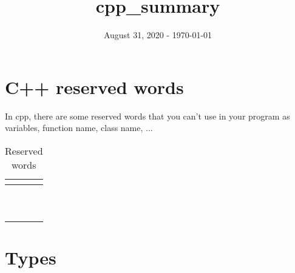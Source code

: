 \documentclass[a4paper, 12pt, titlepage]{scrartcl} %
\title{cpp\_summary}
\author{}
\date{August 31, 2020 - \today}
\begin{document}
\maketitle

\newpage
\section{C++ reserved words}
In cpp, there are some reserved words that you can't use in your program as variables, function name, class name, ...

\vspace{35mm}

\begin{table}[h]
\begin{center}
{\renewcommand{\arraystretch}{2} %
{\setlength{\tabcolsep}{1.5cm} %
\begin{tabular}{|l|c|r|}
  \hline
  \hyperref[]{} & \hyperref[]{} & \hyperref[]{} \\
  \hline
  \hyperref[]{} & \hyperref[]{} & \hyperref[]{} \\
  \hline
  \hyperref[]{} & \hyperref[]{} & \hyperref[]{} \\
  \hline
  \hyperref[]{} & \hyperref[]{} & \hyperref[]{} \\
  \hline
  \hyperref[]{} & \hyperref[]{} & \hyperref[]{} \\
  \hline
  \hyperref[]{} & \hyperref[]{} & \hyperref[]{} \\
  \hline
  \hyperref[]{} & \hyperref[]{} & \hyperref[]{} \\
  \hline
  \hyperref[]{} & \hyperref[]{} & \hyperref[]{} \\
  \hline 
  \hyperref[]{} & \hyperref[]{} & \hyperref[]{} \\
  \hline 
  \hyperref[]{} & \hyperref[]{} & \hyperref[]{} \\
  \hline
  \hyperref[]{} & \hyperref[]{} & \hyperref[]{} \\
  \hline
\end{tabular}}}
\end{center}
\caption{Reserved words}
\end{table} \vspace{5mm}



\clearpage
\section{Types}
\end{document}
